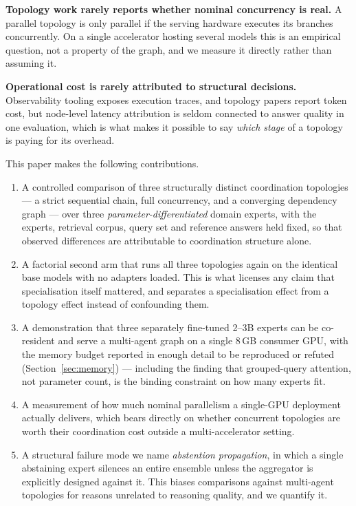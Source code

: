 \documentclass[journal,10pt,compsoc,onecolumn]{IEEEtran}
\begin{document}
\textbf{Topology work rarely reports whether nominal concurrency is real.} A
parallel topology is only parallel if the serving hardware executes its branches
concurrently. On a single accelerator hosting several models this is an empirical
question, not a property of the graph, and we measure it directly rather than
assuming it.

\textbf{Operational cost is rarely attributed to structural decisions.}
Observability tooling exposes execution traces, and topology papers report token
cost, but node-level latency attribution is seldom connected to answer quality in
one evaluation, which is what makes it possible to say \emph{which stage} of a
topology is paying for its overhead.

This paper makes the following contributions.

\begin{enumerate}
\item A controlled comparison of three structurally distinct coordination
topologies --- a strict sequential chain, full concurrency, and a converging
dependency graph --- over three \emph{parameter-differentiated} domain experts,
with the experts, retrieval corpus, query set and reference answers held fixed,
so that observed differences are attributable to coordination structure alone.
\item A factorial second arm that runs all three topologies again on the
identical base models with no adapters loaded. This is what licenses any claim
that specialisation itself mattered, and separates a specialisation effect from a
topology effect instead of confounding them.
\item A demonstration that three separately fine-tuned 2--3B experts can be
co-resident and serve a multi-agent graph on a single 8\,GB consumer GPU, with
the memory budget reported in enough detail to be reproduced or refuted
(Section~\ref{sec:memory}) --- including the finding that grouped-query
attention, not parameter count, is the binding constraint on how many experts
fit.
\item A measurement of how much nominal parallelism a single-GPU deployment
actually delivers, which bears directly on whether concurrent topologies are
worth their coordination cost outside a multi-accelerator setting.
\item A structural failure mode we name \emph{abstention propagation}, in which a
single abstaining expert silences an entire ensemble unless the aggregator is
explicitly designed against it. This biases comparisons against multi-agent
topologies for reasons unrelated to reasoning quality, and we quantify it.
\end{enumerate}
\end{document}
